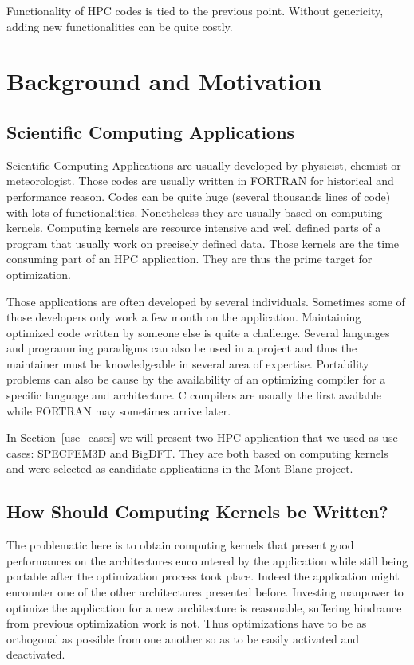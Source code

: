 \documentclass[11pt, a4paper, twoside]{montblanc}
\begin{document}
Functionality of HPC codes is tied to the previous point. Without genericity,
adding new functionalities can be quite costly.

\section{Background and Motivation}

  \subsection{Scientific Computing Applications}

Scientific Computing Applications are usually developed by physicist, chemist or
meteorologist. Those codes are usually written in FORTRAN for historical and
performance reason. Codes can be quite huge (several thousands lines of code)
with lots of functionalities. Nonetheless they are usually based on computing
kernels.  Computing kernels are resource intensive and well defined parts of a
program that usually work on precisely defined data. Those kernels are the time
consuming part of an HPC application. They are thus the prime target for
optimization.

Those applications are often developed by several individuals. Sometimes some of
those developers only work a few month on the application. Maintaining optimized
code written by someone else is quite a challenge. Several languages and
programming paradigms can also be used in a project and thus the maintainer must
be knowledgeable in several area of expertise. Portability problems can also be
cause by the availability of an optimizing compiler for a specific language and
architecture. C compilers are usually the first available while FORTRAN may
sometimes arrive later.

In Section~\ref{use_cases} we will present two HPC application that we used
as use cases: SPECFEM3D and BigDFT. They are both based on computing
kernels and were selected as candidate applications in the Mont-Blanc project.

  \subsection{How Should Computing Kernels be Written?}

The problematic here is to obtain computing kernels that present good
performances on the architectures encountered by the application while still
being portable after the optimization process took place. Indeed the application
might encounter one of the other architectures presented before. Investing
manpower to optimize the application for a new architecture is reasonable,
suffering hindrance from previous optimization work is not. Thus optimizations
have to be as orthogonal as possible from one another so as to be easily
activated and deactivated.
\end{document}
